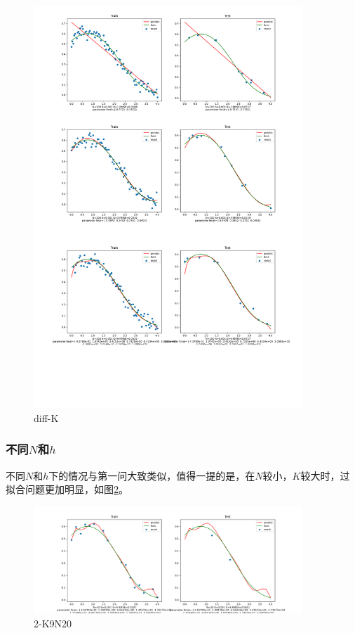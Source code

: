\begin{figure}[H]
    \begin{center}
        \includegraphics[width=0.9\textwidth]{img/2-diff-K.png}
    \end{center}
   \caption[]{diff-K}
    \label{fig:diff-K}
\end{figure} 

\subsubsection{不同$N$和$h$}

不同$N$和$h$下的情况与第一问大致类似，值得一提的是，在$N$较小，$K$较大时，过拟合问题更加明显，如图\ref{fig:2-K9N20}。

\begin{figure}[H]
    \begin{center}
        \includegraphics[width=0.9\textwidth]{img/2-K9N20.png}
    \end{center}
   \caption[]{2-K9N20}
    \label{fig:2-K9N20}
\end{figure} 


